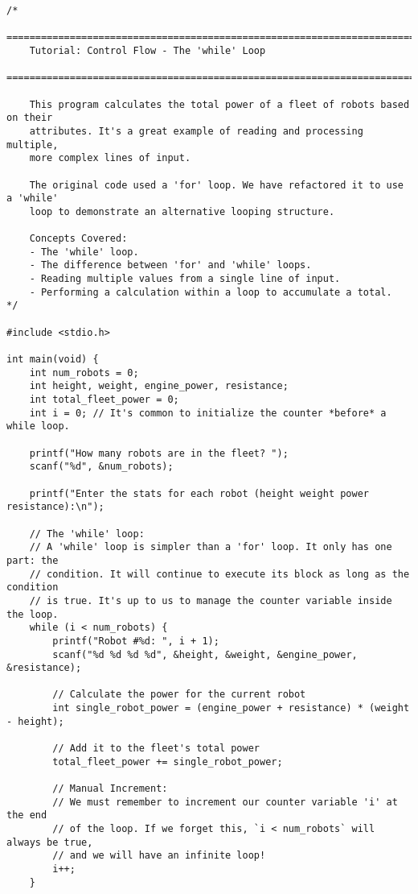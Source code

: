 \documentclass[11pt]{book}
\begin{document}
\begin{verbatim}
/*
    ================================================================================
    Tutorial: Control Flow - The 'while' Loop
    ================================================================================

    This program calculates the total power of a fleet of robots based on their
    attributes. It's a great example of reading and processing multiple,
    more complex lines of input.

    The original code used a 'for' loop. We have refactored it to use a 'while'
    loop to demonstrate an alternative looping structure.

    Concepts Covered:
    - The 'while' loop.
    - The difference between 'for' and 'while' loops.
    - Reading multiple values from a single line of input.
    - Performing a calculation within a loop to accumulate a total.
*/

#include <stdio.h>

int main(void) {
    int num_robots = 0;
    int height, weight, engine_power, resistance;
    int total_fleet_power = 0;
    int i = 0; // It's common to initialize the counter *before* a while loop.

    printf("How many robots are in the fleet? ");
    scanf("%d", &num_robots);

    printf("Enter the stats for each robot (height weight power resistance):\n");

    // The 'while' loop:
    // A 'while' loop is simpler than a 'for' loop. It only has one part: the
    // condition. It will continue to execute its block as long as the condition
    // is true. It's up to us to manage the counter variable inside the loop.
    while (i < num_robots) {
        printf("Robot #%d: ", i + 1);
        scanf("%d %d %d %d", &height, &weight, &engine_power, &resistance);

        // Calculate the power for the current robot
        int single_robot_power = (engine_power + resistance) * (weight - height);

        // Add it to the fleet's total power
        total_fleet_power += single_robot_power;

        // Manual Increment:
        // We must remember to increment our counter variable 'i' at the end
        // of the loop. If we forget this, `i < num_robots` will always be true,
        // and we will have an infinite loop!
        i++;
    }


\end{verbatim}
\end{document}
